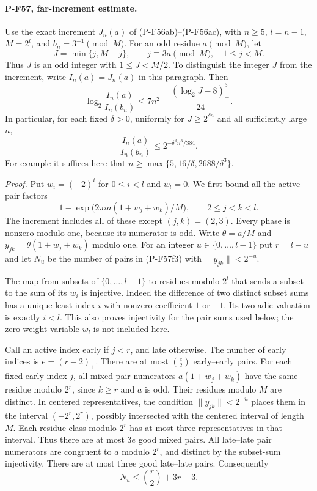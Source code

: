 \paragraph{P-F57, far-increment estimate.}
Use the exact increment $J_n(a)$ of (P-F56ab)--(P-F56ac),
with $n\ge5$, $l=n-1$, $M=2^l$, and $b_n=3^{-1}\pmod M$.
For an odd residue $a\pmod M$, let
\[
 J=\min\{j,M-j\},\qquad j\equiv3a\pmod M,
                 \quad 1\le j<M.
\]
Thus $J$ is an odd integer with $1\le J<M/2$.
To distinguish the integer $J$ from the increment, write
$I_n(a)=J_n(a)$ in this paragraph. Then
\[
 \log_2\frac{I_n(a)}{I_n(b_n)}
       \le 7n^2-\frac{(\log_2J-8)_+^3}{24}.
 \tag{P-F57f1}
\]
In particular, for each fixed $\delta>0$, uniformly for
$J\ge2^{\delta n}$ and all sufficiently large $n$,
\[
       \frac{I_n(a)}{I_n(b_n)}
                    \le2^{-\delta^3n^3/384}.
 \tag{P-F57f2}
\]
For example it suffices here that
$n\ge\max\{5,16/\delta,2688/\delta^3\}$.

\emph{Proof.}
Put $w_i=(-2)^i$ for $0\le i<l$ and $w_l=0$.
We first bound all the active pair factors
\[
       1-\exp\bigl(2\pi i a(1+w_j+w_k)/M\bigr),
                 \qquad 2\le j<k<l.
 \tag{P-F57f3}
\]
The increment includes all of these except $(j,k)=(2,3)$.
Every phase is nonzero modulo one, because its numerator
is odd. Write $\theta=a/M$ and
$y_{jk}=\theta(1+w_j+w_k)$ modulo one.
For an integer $u\in\{0,\ldots,l-1\}$ put
$r=l-u$ and let $N_u$ be the number of pairs in (P-F57f3)
with $\|y_{jk}\|<2^{-u}$.

The map from subsets of $\{0,\ldots,l-1\}$ to residues
modulo $2^l$ that sends a subset to the sum of its $w_i$
is injective. Indeed the difference of two distinct subset
sums has a unique least index $i$ with nonzero coefficient
$1$ or $-1$. Its two-adic valuation is exactly $i<l$.
This also proves injectivity for the pair sums used below;
the zero-weight variable $w_l$ is not included here.

Call an active index early if $j<r$, and late otherwise.
The number of early indices is $e=(r-2)_+$.
There are at most $\binom e2$ early--early pairs.
For each fixed early index $j$, all mixed pair numerators
$a(1+w_j+w_k)$ have the same residue modulo $2^r$,
since $k\ge r$ and $a$ is odd. Their residues modulo $M$
are distinct. In centered representatives, the condition
$\|y_{jk}\|<2^{-u}$ places them in the interval
$(-2^r,2^r)$, possibly intersected with the centered
interval of length $M$. Each residue class modulo $2^r$
has at most three representatives in that interval.
Thus there are at most $3e$ good mixed pairs.
All late--late pair numerators are congruent to $a$
modulo $2^r$, and distinct by the subset-sum injectivity.
There are at most three good late--late pairs. Consequently
\[
             N_u\le\binom r2+3r+3.
 \tag{P-F57f4}
\]

